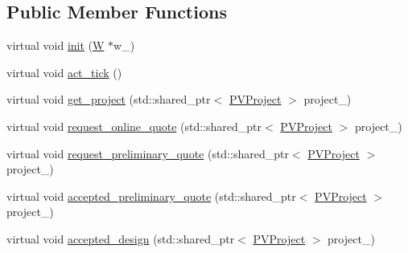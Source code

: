 \subsection*{Public Member Functions}
{\bf }\par
\begin{DoxyCompactItemize}
\item 
virtual void \hyperlink{classsolar__core_1_1_s_e_i_a3dd3a3550f3de5cf4d36c2f83cbd1123}{init} (\hyperlink{classsolar__core_1_1_w}{W} $\ast$w\+\_\+)
\end{DoxyCompactItemize}

{\bf }\par
\begin{DoxyCompactItemize}
\item 
virtual void \hyperlink{classsolar__core_1_1_s_e_i_ab0bd6ae650afc15fe71ce545373ab16e}{act\+\_\+tick} ()
\item 
virtual void \hyperlink{classsolar__core_1_1_s_e_i_ad3730a5f71a2932744916a5a62753c97}{get\+\_\+project} (std\+::shared\+\_\+ptr$<$ \hyperlink{classsolar__core_1_1_p_v_project}{P\+V\+Project} $>$ project\+\_\+)
\end{DoxyCompactItemize}

{\bf }\par
\begin{DoxyCompactItemize}
\item 
virtual void \hyperlink{classsolar__core_1_1_s_e_i_a704af1e2cacd1aba86d5ac406f2231ce}{request\+\_\+online\+\_\+quote} (std\+::shared\+\_\+ptr$<$ \hyperlink{classsolar__core_1_1_p_v_project}{P\+V\+Project} $>$ project\+\_\+)
\item 
virtual void \hyperlink{classsolar__core_1_1_s_e_i_aa34d9c40613ff61fc0c8c911e0734441}{request\+\_\+preliminary\+\_\+quote} (std\+::shared\+\_\+ptr$<$ \hyperlink{classsolar__core_1_1_p_v_project}{P\+V\+Project} $>$ project\+\_\+)
\end{DoxyCompactItemize}

{\bf }\par
\begin{DoxyCompactItemize}
\item 
virtual void \hyperlink{classsolar__core_1_1_s_e_i_ad683e480828c042d311a18cefbf2e95d}{accepted\+\_\+preliminary\+\_\+quote} (std\+::shared\+\_\+ptr$<$ \hyperlink{classsolar__core_1_1_p_v_project}{P\+V\+Project} $>$ project\+\_\+)
\end{DoxyCompactItemize}

{\bf }\par
\begin{DoxyCompactItemize}
\item 
virtual void \hyperlink{classsolar__core_1_1_s_e_i_a007004337169bac4c67b66e37ca89767}{accepted\+\_\+design} (std\+::shared\+\_\+ptr$<$ \hyperlink{classsolar__core_1_1_p_v_project}{P\+V\+Project} $>$ project\+\_\+)
\end{DoxyCompactItemize}

